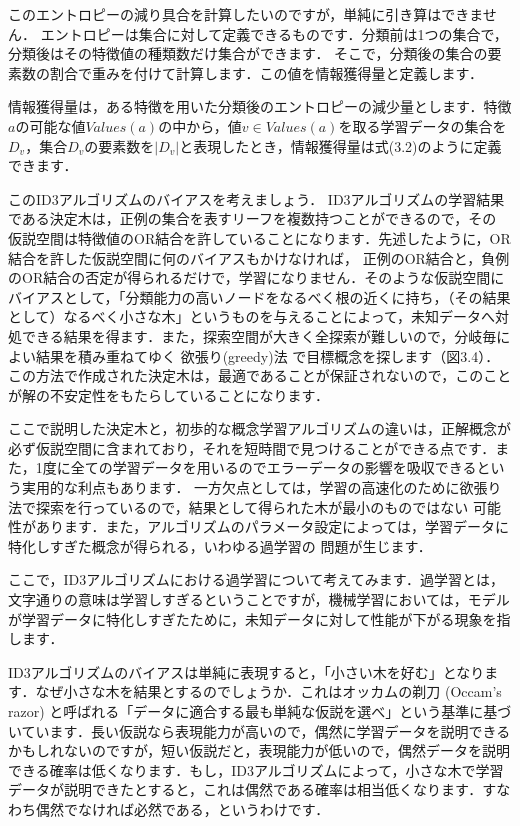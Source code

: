 このエントロピーの減り具合を計算したいのですが，単純に引き算はできません．
エントロピーは集合に対して定義できるものです．分類前は1つの集合で，分類後はその特徴値の種類数だけ集合ができます．
そこで，分類後の集合の要素数の割合で重みを付けて計算します．この値を情報獲得量と定義します．


情報獲得量は，ある特徴を用いた分類後のエントロピーの減少量とします．特徴$a$の可能な値$Values(a)$の中から，値$v \in Values(a)$を取る学習データの集合を$D_v$，集合$D_v$の要素数を$|D_v|$と表現したとき，情報獲得量は式(3.2)のように定義できます．


このID3アルゴリズムのバイアスを考えましょう．
ID3アルゴリズムの学習結果である決定木は，正例の集合を表すリーフを複数持つことができるので，その
仮説空間は特徴値のOR結合を許していることになります．先述したように，OR結合を許した仮説空間に何のバイアスもかけなければ，
正例のOR結合と，負例のOR結合の否定が得られるだけで，学習になりません．そのような仮説空間に
バイアスとして，「分類能力の高いノードをなるべく根の近くに持ち，（その結果として）なるべく小さな木」というものを与えることによって，未知データへ対処できる結果を得ます．また，探索空間が大きく全探索が難しいので，分岐毎によい結果を積み重ねてゆく
欲張り(greedy)法
で目標概念を探します（図3.4）．この方法で作成された決定木は，最適であることが保証されないので，このことが解の不安定性をもたらしていることになります．

ここで説明した決定木と，初歩的な概念学習アルゴリズムの違いは，正解概念が必ず仮説空間に含まれており，それを短時間で見つけることができる点です．また，1度に全ての学習データを用いるのでエラーデータの影響を吸収できるという実用的な利点もあります．
一方欠点としては，学習の高速化のために欲張り法で探索を行っているので，結果として得られた木が最小のものではない
可能性があります．また，アルゴリズムのパラメータ設定によっては，学習データに特化しすぎた概念が得られる，いわゆる過学習の
問題が生じます．


ここで，ID3アルゴリズムにおける過学習について考えてみます．過学習とは，文字通りの意味は学習しすぎるということですが，機械学習においては，モデルが学習データに特化しすぎたために，未知データに対して性能が下がる現象を指します．

ID3アルゴリズムのバイアスは単純に表現すると，「小さい木を好む」となります．なぜ小さな木を結果とするのでしょうか．これはオッカムの剃刀 (Occam's razor) と呼ばれる「データに適合する最も単純な仮説を選べ」という基準に基づいています．長い仮説なら表現能力が高いので，偶然に学習データを説明できるかもしれないのですが，短い仮説だと，表現能力が低いので，偶然データを説明できる確率は低くなります．もし，ID3アルゴリズムによって，小さな木で学習データが説明できたとすると，これは偶然である確率は相当低くなります．すなわち偶然でなければ必然である，というわけです．

